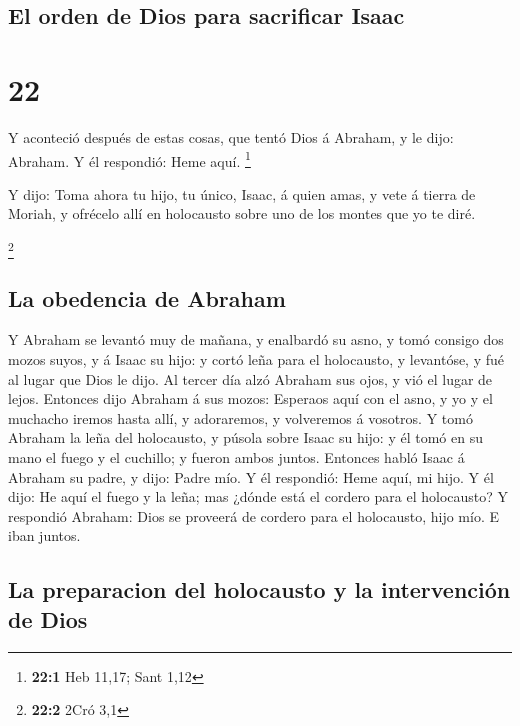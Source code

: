 \hypertarget{el-orden-de-dios-para-sacrificar-isaac}{%
\subsection{El orden de Dios para sacrificar
Isaac}\label{el-orden-de-dios-para-sacrificar-isaac}}

\hypertarget{section-21}{%
\section{22}\label{section-21}}

 Y aconteció después de estas cosas, que tentó Dios á
Abraham, y le dijo: Abraham. Y él respondió: Heme aquí. \footnote{\textbf{22:1}
  Heb 11,17; Sant 1,12}

 Y dijo: Toma ahora tu hijo, tu único, Isaac, á quien amas,
y vete á tierra de Moriah, y ofrécelo allí en holocausto sobre uno de
los montes que yo te diré.

\footnote{\textbf{22:2} 2Cró 3,1}

\hypertarget{la-obedencia-de-abraham}{%
\subsection{La obedencia de Abraham}\label{la-obedencia-de-abraham}}

 Y Abraham se levantó muy de mañana, y enalbardó su asno, y
tomó consigo dos mozos suyos, y á Isaac su hijo: y cortó leña para el
holocausto, y levantóse, y fué al lugar que Dios le dijo. 
Al tercer día alzó Abraham sus ojos, y vió el lugar de lejos.
 Entonces dijo Abraham á sus mozos: Esperaos aquí con el
asno, y yo y el muchacho iremos hasta allí, y adoraremos, y volveremos á
vosotros.  Y tomó Abraham la leña del holocausto, y púsola
sobre Isaac su hijo: y él tomó en su mano el fuego y el cuchillo; y
fueron ambos juntos.  Entonces habló Isaac á Abraham su
padre, y dijo: Padre mío. Y él respondió: Heme aquí, mi hijo. Y él dijo:
He aquí el fuego y la leña; mas ¿dónde está el cordero para el
holocausto?  Y respondió Abraham: Dios se proveerá de
cordero para el holocausto, hijo mío. E iban juntos.

\hypertarget{la-preparacion-del-holocausto-y-la-intervenciuxf3n-de-dios}{%
\subsection{La preparacion del holocausto y la intervención de
Dios}\label{la-preparacion-del-holocausto-y-la-intervenciuxf3n-de-dios}}

